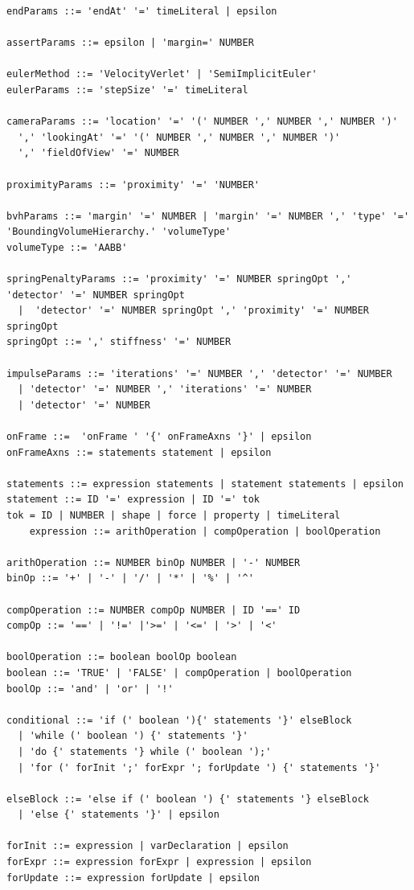 \begin{verbatim}
endParams ::= 'endAt' '=' timeLiteral | epsilon 

assertParams ::= epsilon | 'margin=' NUMBER 

eulerMethod ::= 'VelocityVerlet' | 'SemiImplicitEuler'
eulerParams ::= 'stepSize' '=' timeLiteral

cameraParams ::= 'location' '=' '(' NUMBER ',' NUMBER ',' NUMBER ')'
  ',' 'lookingAt' '=' '(' NUMBER ',' NUMBER ',' NUMBER ')' 
  ',' 'fieldOfView' '=' NUMBER

proximityParams ::= 'proximity' '=' 'NUMBER'

bvhParams ::= 'margin' '=' NUMBER | 'margin' '=' NUMBER ',' 'type' '=' 'BoundingVolumeHierarchy.' 'volumeType'
volumeType ::= 'AABB'

springPenaltyParams ::= 'proximity' '=' NUMBER springOpt ',' 'detector' '=' NUMBER springOpt
  |  'detector' '=' NUMBER springOpt ',' 'proximity' '=' NUMBER springOpt
springOpt ::= ',' stiffness' '=' NUMBER 

impulseParams ::= 'iterations' '=' NUMBER ',' 'detector' '=' NUMBER 
  | 'detector' '=' NUMBER ',' 'iterations' '=' NUMBER
  | 'detector' '=' NUMBER

onFrame ::=  'onFrame ' '{' onFrameAxns '}' | epsilon
onFrameAxns ::= statements statement | epsilon

statements ::= expression statements | statement statements | epsilon
statement ::= ID '=' expression | ID '=' tok
tok = ID | NUMBER | shape | force | property | timeLiteral
	expression ::= arithOperation | compOperation | boolOperation

arithOperation ::= NUMBER binOp NUMBER | '-' NUMBER
binOp ::= '+' | '-' | '/' | '*' | '%' | '^'

compOperation ::= NUMBER compOp NUMBER | ID '==' ID
compOp ::= '==' | '!=' |'>=' | '<=' | '>' | '<'

boolOperation ::= boolean boolOp boolean
boolean ::= 'TRUE' | 'FALSE' | compOperation | boolOperation
boolOp ::= 'and' | 'or' | '!'

conditional ::= 'if (' boolean '){' statements '}' elseBlock 
  | 'while (' boolean ') {' statements '}' 
  | 'do {' statements '} while (' boolean ');' 
  | 'for (' forInit ';' forExpr '; forUpdate ') {' statements '}'

elseBlock ::= 'else if (' boolean ') {' statements '} elseBlock 
  | 'else {' statements '}' | epsilon

forInit ::= expression | varDeclaration | epsilon
forExpr ::= expression forExpr | expression | epsilon
forUpdate ::= expression forUpdate | epsilon

\end{verbatim}
